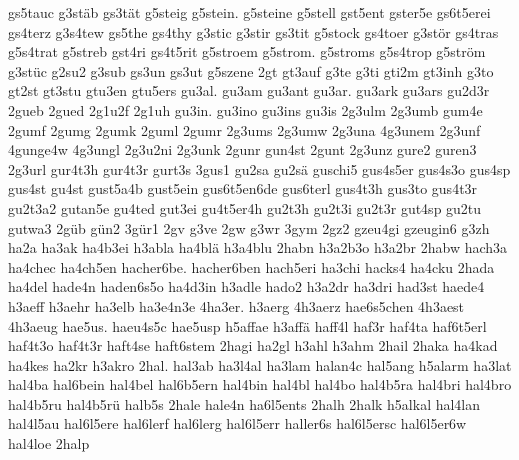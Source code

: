 {    gs5tauc
    g3stäb
    gs3tät
    g5steig
    g5stein.
    g5steine
    g5stell
    gst5ent
    gster5e
    gs6t5erei
    gs4terz
    g3s4tew
    gs5the
    gs4thy
    g3stic
    g3stir
    gs3tit
    g5stock
    gs4toer
    g3stör
    gs4tras
    g5s4trat
    g5streb
    gst4ri
    gs4t5rit
    g5stroem
    g5strom.
    g5stroms
    g5s4trop
    g5ström
    g3stüc
    g2su2
    g3sub
    gs3un
    gs3ut
    g5szene
    2gt
    gt3auf
    g3te
    g3ti
    gti2m
    gt3inh
    g3to
    gt2st
    gt3stu
    gtu3en
    gtu5ers
    gu3al.
    gu3am
    gu3ant
    gu3ar.
    gu3ark
    gu3ars
    gu2d3r
    2gueb
    2gued
    2g1u2f
    2g1uh
    gu3in.
    gu3ino
    gu3ins
    gu3is
    2g3ulm
    2g3umb
    gum4e
    2gumf
    2gumg
    2gumk
    2guml
    2gumr
    2g3ums
    2g3umw
    2g3una
    4g3unem
    2g3unf
    4gunge4w
    4g3ungl
    2g3u2ni
    2g3unk
    2gunr
    gun4st
    2gunt
    2g3unz
    gure2
    guren3
    2g3url
    gur4t3h
    gur4t3r
    gurt3s
    3gus1
    gu2sa
    gu2sä
    guschi5
    gus4s5er
    gus4s3o
    gus4sp
    gus4st
    gu4st
    gust5a4b
    gust5ein
    gus6t5en6de
    gus6terl
    gus4t3h
    gus3to
    gus4t3r
    gu2t3a2
    gutan5e
    gu4ted
    gut3ei
    gu4t5er4h
    gu2t3h
    gu2t3i
    gu2t3r
    gut4sp
    gu2tu
    gutwa3
    2güb
    gün2
    3gür1
    2gv
    g3ve
    2gw
    g3wr
    3gym
    2gz2
    gzeu4gi
    gzeugin6
    g3zh
    ha2a
    ha3ak
    ha4b3ei
    h3abla
    ha4blä
    h3a4blu
    2habn
    h3a2b3o
    h3a2br
    2habw
    hach3a
    ha4chec
    ha4ch5en
    hacher6be.
    hacher6ben
    hach5eri
    ha3chi
    hacks4
    ha4cku
    2hada
    ha4del
    hade4n
    haden6s5o
    ha4d3in
    h3adle
    hado2
    h3a2dr
    ha3dri
    had3st
    haede4
    h3aeff
    h3aehr
    ha3elb
    ha3e4n3e
    4ha3er.
    h3aerg
    4h3aerz
    hae6s5chen
    4h3aest
    4h3aeug
    hae5us.
    haeu4s5c
    hae5usp
    h5affae
    h3affä
    haff4l
    haf3r
    haf4ta
    haf6t5erl
    haf4t3o
    haf4t3r
    haft4se
    haft6stem
    2hagi
    ha2gl
    h3ahl
    h3ahm
    2hail
    2haka
    ha4kad
    ha4kes
    ha2kr
    h3akro
    2hal.
    hal3ab
    ha3l4al
    ha3lam
    halan4c
    hal5ang
    h5alarm
    ha3lat
    hal4ba
    hal6bein
    hal4bel
    hal6b5ern
    hal4bin
    hal4bl
    hal4bo
    hal4b5ra
    hal4bri
    hal4bro
    hal4b5ru
    hal4b5rü
    halb5s
    2hale
    hale4n
    ha6l5ents
    2halh
    2halk
    h5alkal
    hal4lan
    hal4l5au
    hal6l5ere
    hal6lerf
    hal6lerg
    hal6l5err
    haller6s
    hal6l5ersc
    hal6l5er6w
    hal4loe
    2halp
}
